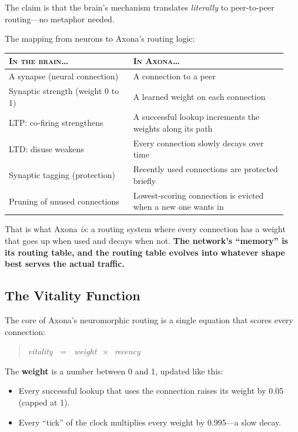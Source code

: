 \documentclass[nobib,justified]{tufte-handout}
\begin{document}
The claim is that the brain's mechanism translates \emph{literally} to peer-to-peer routing---no metaphor needed.

The mapping from neurons to Axona's routing logic:

\begin{table}[h]
\small
\begin{tabular}{@{}p{0.42\linewidth}p{0.52\linewidth}@{}}
\toprule
\textsc{In the brain\dots} & \textsc{In Axona\dots} \\
\midrule
A synapse (neural connection) & A connection to a peer \\
Synaptic strength (weight 0 to 1) & A learned weight on each connection \\
LTP: co-firing strengthens & A successful lookup increments the weights along its path \\
LTD: disuse weakens & Every connection slowly decays over time \\
Synaptic tagging (protection) & Recently used connections are protected briefly \\
Pruning of unused connections & Lowest-scoring connection is evicted when a new one wants in \\
\bottomrule
\end{tabular}
\end{table}

That is what Axona \emph{is}: a routing system where every connection has a weight that goes up when used and decays when not. \textbf{The network's ``memory'' is its routing table, and the routing table evolves into whatever shape best serves the actual traffic.}

\subsection{The Vitality Function}

The core of Axona's neuromorphic routing is a single equation that scores every connection:

\begin{quote}
\centering\itshape
vitality $\;=\;$ weight $\,\times\,$ recency
\end{quote}

The \textbf{weight} is a number between 0 and 1, updated like this:
\begin{itemize}
  \item Every successful lookup that uses the connection raises its weight by 0.05 (capped at 1).
  \item Every ``tick'' of the clock multiplies every weight by 0.995---a slow decay.
\end{itemize}
\end{document}
